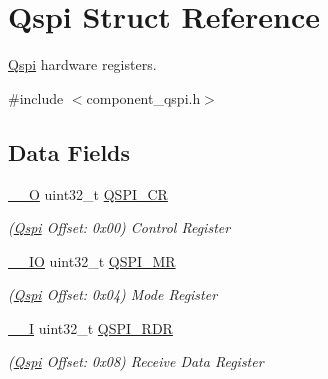 \hypertarget{structQspi}{}\section{Qspi Struct Reference}
\label{structQspi}


\mbox{\hyperlink{structQspi}{Qspi}} hardware registers.  




{\ttfamily \#include $<$component\+\_\+qspi.\+h$>$}

\subsection*{Data Fields}
\begin{DoxyCompactItemize}
\item 
\mbox{\label{structQspi_a568109a701c00882bec4a6307f95b5dd}} 
\mbox{\hyperlink{core__cm7_8h_a7e25d9380f9ef903923964322e71f2f6}{\+\_\+\+\_\+O}} uint32\+\_\+t \mbox{\hyperlink{structQspi_a568109a701c00882bec4a6307f95b5dd}{Q\+S\+P\+I\+\_\+\+CR}}
\begin{DoxyCompactList}\small\item\em (\mbox{\hyperlink{structQspi}{Qspi}} Offset\+: 0x00) Control Register \end{DoxyCompactList}\item 
\mbox{\label{structQspi_a6e5738c4defd648cbb9b8d376d24c3f8}} 
\mbox{\hyperlink{core__cm7_8h_aec43007d9998a0a0e01faede4133d6be}{\+\_\+\+\_\+\+IO}} uint32\+\_\+t \mbox{\hyperlink{structQspi_a6e5738c4defd648cbb9b8d376d24c3f8}{Q\+S\+P\+I\+\_\+\+MR}}
\begin{DoxyCompactList}\small\item\em (\mbox{\hyperlink{structQspi}{Qspi}} Offset\+: 0x04) Mode Register \end{DoxyCompactList}\item 
\mbox{\label{structQspi_ade5e7d885774eedf6c53ed64c96b5d0d}} 
\mbox{\hyperlink{core__cm7_8h_af63697ed9952cc71e1225efe205f6cd3}{\+\_\+\+\_\+I}} uint32\+\_\+t \mbox{\hyperlink{structQspi_ade5e7d885774eedf6c53ed64c96b5d0d}{Q\+S\+P\+I\+\_\+\+R\+DR}}
\begin{DoxyCompactList}\small\item\em (\mbox{\hyperlink{structQspi}{Qspi}} Offset\+: 0x08) Receive Data Register \end{DoxyCompactList}\item 

\end{DoxyCompactItemize}
